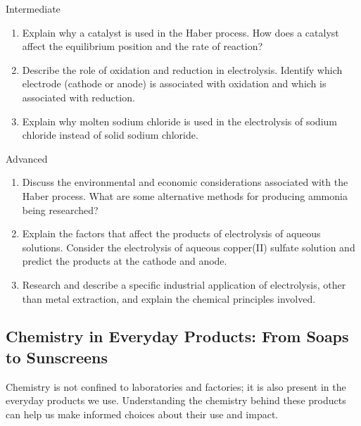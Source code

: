 \begin{tieredquestions}{Intermediate}
\begin{enumerate}
    \item Explain why a catalyst is used in the Haber process. How does a catalyst affect the equilibrium position and the rate of reaction?
    \item Describe the role of oxidation and reduction in electrolysis. Identify which electrode (cathode or anode) is associated with oxidation and which is associated with reduction.
    \item Explain why molten sodium chloride is used in the electrolysis of sodium chloride instead of solid sodium chloride.
\end{enumerate}
\end{tieredquestions}

\begin{tieredquestions}{Advanced}
\begin{enumerate}
    \item Discuss the environmental and economic considerations associated with the Haber process. What are some alternative methods for producing ammonia being researched?
    \item Explain the factors that affect the products of electrolysis of aqueous solutions. Consider the electrolysis of aqueous copper(II) sulfate solution and predict the products at the cathode and anode.
    \item Research and describe a specific industrial application of electrolysis, other than metal extraction, and explain the chemical principles involved.
\end{enumerate}
\end{tieredquestions}

\subsection{Chemistry in Everyday Products: From Soaps to Sunscreens}

Chemistry is not confined to laboratories and factories; it is also present in the everyday products we use. Understanding the chemistry behind these products can help us make informed choices about their use and impact.

